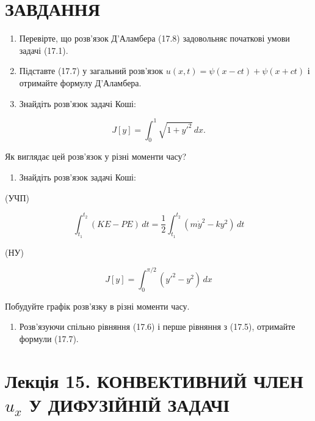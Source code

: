 \documentclass[
  ukrainian,
]{article}
\providecommand{\tightlist}{%
  \setlength{\itemsep}{0pt}\setlength{\parskip}{0pt}}
\begin{document}
\section{ЗАВДАННЯ}\label{ux437ux430ux432ux434ux430ux43dux43dux44f-11}

\begin{enumerate}
\def\labelenumi{\arabic{enumi}.}
\item
  Перевірте, що розв'язок Д'Аламбера (17.8) задовольняє початкові умови
  задачі (17.1).
\item
  Підставте (17.7) у загальний розв'язок
  \(u(x, t) = \psi(x - ct) + \psi(x + ct)\) і отримайте формулу
  Д'Аламбера.
\item
  Знайдіть розв'язок задачі Коші:
\end{enumerate}

\[
J[y] = \int_{0}^{1} \sqrt{1 + y'^{2}}\,dx.
\]

Як виглядає цей розв'язок у різні моменти часу?

\begin{enumerate}
\def\labelenumi{\arabic{enumi}.}
\setcounter{enumi}{3}
\tightlist
\item
  Знайдіть розв'язок задачі Коші:
\end{enumerate}

(УЧП)

\[
\int_{t_{1}}^{t_{2}} (KE - PE)\,dt = \frac{1}{2} \int_{t_{1}}^{t_{2}} (m\dot{y}^{2} - ky^{2})\,dt
\]

(НУ)

\[
J[y] = \int_{0}^{\pi/2} (y'^{2} - y^{2})\,dx
\]

Побудуйте графік розв'язку в різні моменти часу.

\begin{enumerate}
\def\labelenumi{\arabic{enumi}.}
\setcounter{enumi}{4}
\tightlist
\item
  Розв'язуючи спільно рівняння (17.6) і перше рівняння з (17.5),
  отримайте формули (17.7).
\end{enumerate}

\section{\texorpdfstring{Лекція 15. КОНВЕКТИВНИЙ ЧЛЕН \(u_x\) У
ДИФУЗІЙНІЙ
ЗАДАЧІ}{Лекція 15. КОНВЕКТИВНИЙ ЧЛЕН u\_x У ДИФУЗІЙНІЙ ЗАДАЧІ}}\label{ux43bux435ux43aux446ux456ux44f-15.-ux43aux43eux43dux432ux435ux43aux442ux438ux432ux43dux438ux439-ux447ux43bux435ux43d-u_x-ux443-ux434ux438ux444ux443ux437ux456ux439ux43dux456ux439-ux437ux430ux434ux430ux447ux456}
\end{document}
